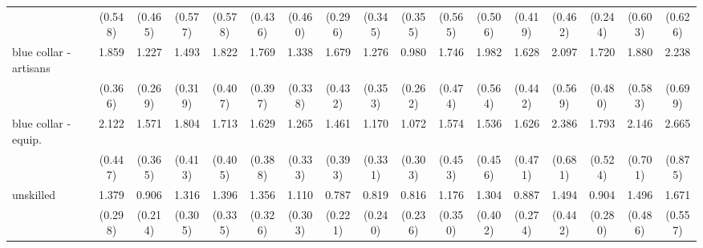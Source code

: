 {\begin{tabular}{l*{16}{c}}
                    &     (0.548)         &     (0.465)         &     (0.577)         &     (0.578)         &     (0.436)         &     (0.460)         &     (0.296)         &     (0.345)         &     (0.355)         &     (0.565)         &     (0.506)         &     (0.419)         &     (0.462)         &     (0.244)         &     (0.603)         &     (0.626)         \\
[1em]
blue collar - artisans&       1.859\sym{**} &       1.227         &       1.493         &       1.822\sym{**} &       1.769\sym{*}  &       1.338         &       1.679\sym{*}  &       1.276         &       0.980         &       1.746\sym{*}  &       1.982\sym{*}  &       1.628         &       2.097\sym{**} &       1.720         &       1.880\sym{*}  &       2.238\sym{**} \\
                    &     (0.366)         &     (0.269)         &     (0.319)         &     (0.407)         &     (0.397)         &     (0.338)         &     (0.432)         &     (0.353)         &     (0.262)         &     (0.474)         &     (0.564)         &     (0.442)         &     (0.569)         &     (0.480)         &     (0.583)         &     (0.699)         \\
[1em]
blue collar - equip.&       2.122\sym{***}&       1.571         &       1.804\sym{**} &       1.713\sym{*}  &       1.629\sym{*}  &       1.265         &       1.461         &       1.170         &       1.072         &       1.574         &       1.536         &       1.626         &       2.386\sym{**} &       1.793\sym{*}  &       2.146\sym{*}  &       2.665\sym{**} \\
                    &     (0.447)         &     (0.365)         &     (0.413)         &     (0.405)         &     (0.388)         &     (0.333)         &     (0.393)         &     (0.331)         &     (0.303)         &     (0.453)         &     (0.456)         &     (0.471)         &     (0.681)         &     (0.524)         &     (0.701)         &     (0.875)         \\
[1em]
unskilled           &       1.379         &       0.906         &       1.316         &       1.396         &       1.356         &       1.110         &       0.787         &       0.819         &       0.816         &       1.176         &       1.304         &       0.887         &       1.494         &       0.904         &       1.496         &       1.671         \\
                    &     (0.298)         &     (0.214)         &     (0.305)         &     (0.335)         &     (0.326)         &     (0.303)         &     (0.221)         &     (0.240)         &     (0.236)         &     (0.350)         &     (0.402)         &     (0.274)         &     (0.442)         &     (0.280)         &     (0.486)         &     (0.557)         \\

\end{tabular}}

